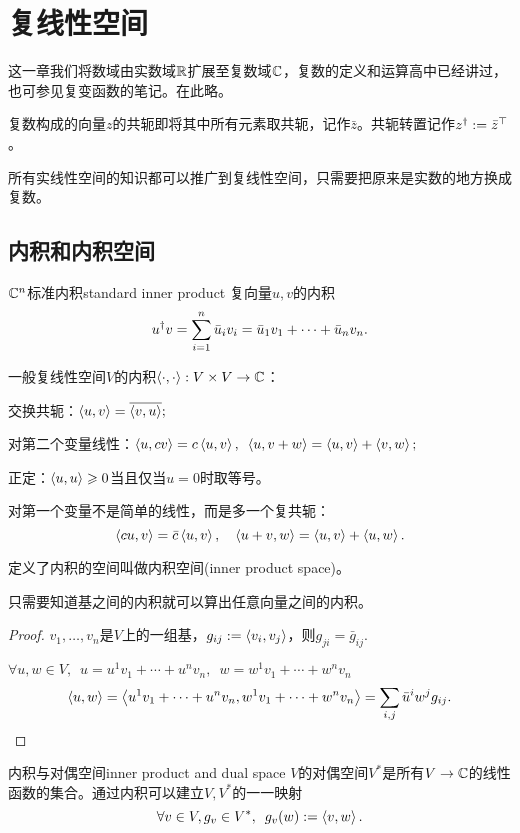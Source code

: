 \chapter{复线性空间}
\label{chap:complex linear space}

这一章我们将数域由实数域$\mathbb R$扩展至复数域$\mathbb C$，复数的定义和运算高中已经讲过，也可参见复变函数的笔记。在此略。

复数构成的向量$z$的共轭即将其中所有元素取共轭，记作$\bar z$。共轭转置记作$z^\dagger:=\bar z^\top$。

所有实线性空间的知识都可以推广到复线性空间，只需要把原来是实数的地方换成复数。
\section{内积和内积空间}
\begin{definition}{$\mathbb C^n$标准内积}{standard inner product}
	复向量$u,v$的内积
	\[
		u^\dagger v=\sum_{i=1}^n\bar u_iv_i=\bar u_1v_1+\cdots+\bar u_nv_n.
	\]
\end{definition}
一般复线性空间$V$的内积$\left\langle \cdot,\cdot\right\rangle:V\times V\to\mathbb C$：
\begin{compactitem}
	\item 交换共轭：$\left\langle u,v\right\rangle=\overline{\left\langle v,u\right\rangle};$
	\item 对第二个变量线性：$\left\langle u,cv\right\rangle=c\left\langle u,v\right\rangle,\enspace \left\langle u,v+w\right\rangle=\left\langle u,v\right\rangle+\left\langle v,w\right\rangle;$
	\item 正定：$\left\langle u,u\right\rangle\geqslant 0$当且仅当$u=0$时取等号。
\end{compactitem}
\begin{remark}
	对第一个变量不是简单的线性，而是多一个复共轭：
	\[
		\left\langle cu,v\right\rangle=\bar c\left\langle u,v\right\rangle,\quad \left\langle u+v,w\right\rangle=\left\langle u,v\right\rangle+\left\langle u,w\right\rangle.
	\]
\end{remark}
定义了内积的空间叫做内积空间(inner product space)。
\begin{theorem}{}{}
	只需要知道基之间的内积就可以算出任意向量之间的内积。
\end{theorem}
\begin{proof}
	$v_1,\ldots,v_n$是$V$上的一组基，$g_{ij}:=\left\langle v_i,v_j\right\rangle$，则$g_{ji}=\bar g_{ij}.$
	
	$\forall u,w\in V,\enspace u=u^1v_1+\cdots+u^nv_n,\enspace w=w^1v_1+\cdots+w^nv_n$
	\[
		\left\langle u,w\right\rangle=\left\langle u^1v_1+\cdots+u^nv_n,w^1v_1+\cdots+w^nv_n\right\rangle=\sum_{i,j}\bar u^iw^jg_{ij}.
	\]
\end{proof}
\begin{example}{内积与对偶空间}{inner product and dual space}
	$V$的对偶空间$V^\ast$是所有$V\to\mathbb C$的线性函数的集合。通过内积可以建立$V,V^\ast$的一一映射
	\[
		\forall v\in V,g_v\in V^\ast,\enspace g_v(w):=\left\langle v,w\right\rangle
.	\]
\end{example}
